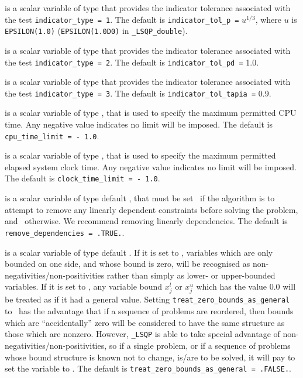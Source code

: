 \documentclass{galahad}
\newcommand{\packagename}{LSQP}
\newcommand{\fullpackagename}{\libraryname\_\-\packagename}
\begin{document}
\begin{description}
is a scalar variable of type \realdp that
provides the indicator tolerance associated with the test
{\tt indicator\_type = 1}.
The default is {\tt indicator\_tol\_p =} $u^{1/3}$,
where $u$ is {\tt EPSILON(1.0)} ({\tt EPSILON(1.0D0)} in 
{\tt \fullpackagename\_double}).

is a scalar variable of type \realdp that
provides the indicator tolerance associated with the test
{\tt indicator\_type = 2}.
The default is {\tt indicator\_tol\_pd =} 1.0.

is a scalar variable of type \realdp that
provides the indicator tolerance associated with the test
{\tt indicator\_type = 3}.
The default is {\tt indicator\_tol\-\_tapia =} 0.9.

 is a scalar variable of type \realdp, 
that is used to specify the maximum permitted CPU time. Any negative
value indicates no limit will be imposed. The default is 
{\tt cpu\_time\_limit = - 1.0}.

 is a scalar variable of type \realdp, 
that is used to specify the maximum permitted elapsed system clock time. 
Any negative value indicates no limit will be imposed. The default is 
{\tt clock\_time\_limit = - 1.0}.

 is a scalar variable of type 
default \logical, that must be set \true\ if the algorithm
is to attempt to remove any linearly dependent constraints before
solving the problem, and \false\ otherwise. 
We recommend removing linearly dependencies.
The default is {\tt remove\_dependencies = .TRUE.}.

 is a scalar variable of type 
default \logical.
If it is set to \false, variables which 
are only bounded on one side, and whose bound is zero,
will be recognised as non-negativities/non-positivities rather than simply as
lower- or upper-bounded variables.
If it is set to \true, any variable bound 
$x_{j}^{l}$ or $x_{j}^{u}$ which has the value 0.0 will be
treated as if it had a general value.
Setting {\tt treat\_zero\_bounds\_as\_general} to \true\ has the advantage
that if a sequence of problems are reordered, then bounds which are
``accidentally'' zero will be considered to have the same structure as
those which are nonzero. However, {\tt \fullpackagename} is
able to take special advantage of non-negativities/non-positivities, so
if a single problem, or if a sequence of problems whose 
bound structure is known not to change, is/are to be solved, 
it will pay to set the variable to \false.
The default is {\tt treat\_zero\_bounds\_as\_general = .FALSE.}.


\end{description}
\end{document}
